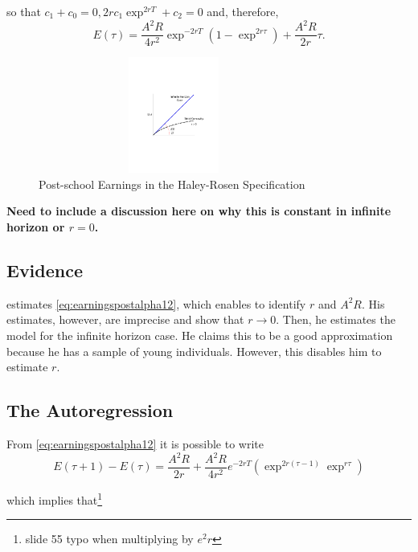 \noindent so that $c_{1} + c_{0} = 0, 2rc_1 \exp^{2rT}  + c_{2} = 0$ and, therefore,
\begin{equation}
E(\tau) = \frac{A^2 R}{4r^2} \exp^{-2r T} \left( 1 - \exp^{2r \tau} \right) + \frac{A^2 R}{2r} \tau. \label{eq:earningspostalpha12}
\end{equation}

\begin{center}
\begin{figure}[H]
\caption{Post-school Earnings in the Haley-Rosen Specification}
\centering
\includegraphics[width=3.5in, height=1.5in]{Figures/fig-finite-horiz.pdf}
\end{figure}
\end{center}

\indent \textbf{Need to include a discussion here on why this is constant in infinite horizon or $r = 0$.}

\subsection{Evidence}
\citet{brown1976model} estimates \eqref{eq:earningspostalpha12}, which enables to identify $r$ and $A^2 R$. His estimates, however, are imprecise and show that $r \rightarrow 0$. Then, he estimates the model for the infinite horizon case. He claims this to be a good approximation because he has a sample of young individuals. However, this disables him to estimate $r$.

\subsection{The Autoregression}
From \eqref{eq:earningspostalpha12} it is possible to write
\begin{equation}
E(\tau + 1) - E(\tau) =  \frac{A^2 R}{2r}+ \frac{A^2 R}{4r^2} e^{-2rT} \left( \exp^{2r(\tau - 1)} \exp^{r \tau} \right) 
\end{equation}

\noindent which implies that\footnote{slide 55 typo when multiplying by $e^2r$}

